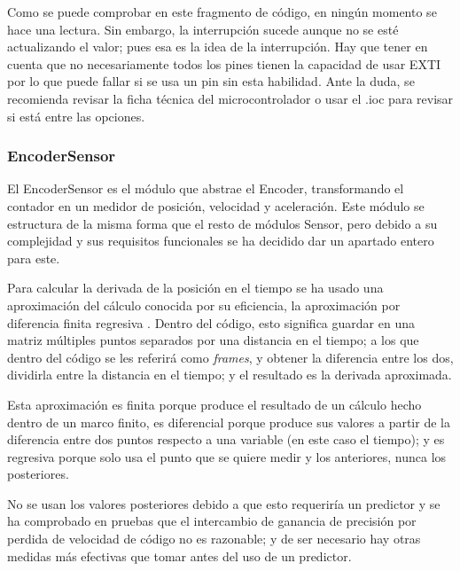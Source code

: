 \documentclass{report}
\begin{document}
\par \vspace{0.3cm}
Como se puede comprobar en este fragmento de código, en ningún momento se hace una lectura. Sin embargo, la interrupción sucede aunque no se esté actualizando el valor; pues esa es la idea de la interrupción. Hay que tener en cuenta que no necesariamente todos los pines tienen la capacidad de usar EXTI por lo que puede fallar si se usa un pin sin esta habilidad. Ante la duda, se recomienda revisar la ficha técnica del microcontrolador o usar el .ioc para revisar si está entre las opciones. 

\subsubsection{EncoderSensor}
El EncoderSensor es el módulo que abstrae el Encoder, transformando el contador en un medidor de posición, velocidad y aceleración. Este módulo se estructura de la misma forma que el resto de módulos Sensor, pero debido a su complejidad y sus requisitos funcionales se ha decidido dar un apartado entero para este. 
\par \vspace{0.3cm}
Para calcular la derivada de la posición en el tiempo se ha usado una aproximación del cálculo conocida por su eficiencia, la aproximación por diferencia finita regresiva \cite{web:github:EncoderWiki}. Dentro del código, esto significa guardar en una matriz múltiples puntos separados por una distancia en el tiempo; a los que dentro del código se les referirá como \textit{frames}, y obtener la diferencia entre los dos, dividirla entre la distancia en el tiempo; y el resultado es la derivada aproximada. 
\par \vspace{0.3cm}
Esta aproximación es finita porque produce el resultado de un cálculo hecho dentro de un marco finito, es diferencial porque produce sus valores a partir de la diferencia entre dos puntos respecto a una variable (en este caso el tiempo); y es regresiva porque solo usa el punto que se quiere medir y los anteriores, nunca los posteriores. \par 
No se usan los valores posteriores debido a que esto requeriría un predictor y se ha comprobado en pruebas que el intercambio de ganancia de precisión por perdida de velocidad de código no es razonable; y de ser necesario hay otras medidas más efectivas que tomar antes del uso de un predictor. 
\par \vspace{0.3cm}
\end{document}
